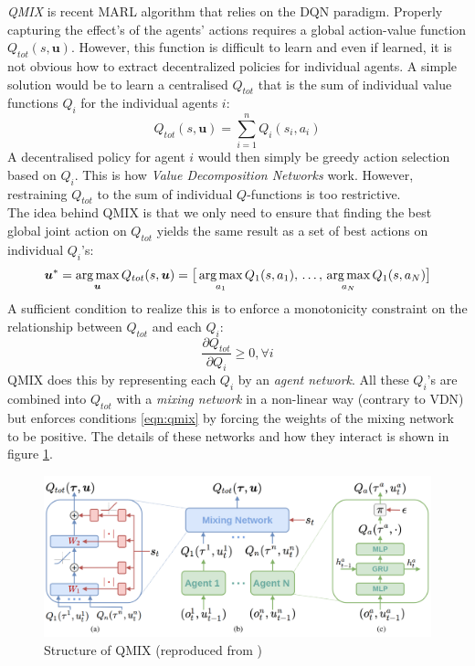 \emph{QMIX} \cite{rashid2018qmix} is recent MARL algorithm that relies on the DQN paradigm. Properly capturing the effect's of the agents' actions requires a global action-value function $Q_{tot}(s, \bm{u})$. However,  this function is difficult to learn and even if learned, it is not obvious how to extract decentralized policies for individual agents. A simple solution would be to learn a centralised $Q_{tot}$ that is the sum of individual value functions $Q_i$ for the individual agents $i$:
\begin{equation}
    Q_{tot}(s, \bm{u}) = \sum_{i=1}^{n} Q_i(s_i, a_i)
\end{equation}
A decentralised policy for agent $i$ would then simply be greedy action selection based on $Q_i$. This is how \emph{Value Decomposition Networks} \cite{sunehag2018value} work. However, restraining $Q_{tot}$ to the sum of individual $Q$-functions is too restrictive.\\

The idea behind QMIX is that we only need to ensure that finding the best global joint action on $Q_{tot}$ yields the same result as a set of best actions on individual $Q_i$'s:
\begin{equation}
    \bm{u}^* = \operatorname*{arg\,max}_{\bm{u}} Q_{tot}(s, \bm{u}) = \big [ \operatorname*{arg\,max}_{a_1} Q_1(s, a_1), \, \ldots,\, \operatorname*{arg\,max}_{a_N} Q_1(s, a_N) \big ]
\end{equation}
A sufficient condition to realize this is to enforce a monotonicity constraint on the relationship between $Q_{tot}$ and each $Q_i$:
\begin{equation}
    \label{eqn:qmix}
    \frac{\partial Q_{tot}}{\partial Q_i} \geq 0, \forall i
\end{equation}
QMIX does this by representing each $ Q_i$ by an \emph{agent network}. All these $Q_i$'s are combined into $Q_{tot}$ with a \emph{mixing network} in a non-linear way (contrary to VDN) but enforces conditions \ref{eqn:qmix} by forcing the weights of the mixing network to be positive. The details of these networks and how they interact is shown in figure \ref{fig:qmix_structure}.\\

\begin{figure}[htp]
    \centering
    \includegraphics[width=16cm]{images/qmix_structure.png}
    \caption{Structure of QMIX (reproduced from \cite{rashid2018qmix})}
    \label{fig:qmix_structure}
\end{figure}

